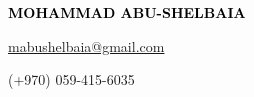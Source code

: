 \documentclass[9pt]{developercv} %
\begin{document}

\begin{minipage}[t]{0.5\textwidth} 
	\vspace{-\baselineskip} %
	
	{ \fontsize{16}{20} \textcolor{black}{\textbf{\MakeUppercase{Mohammad Abu-Shelbaia}}}} %
	
	\vspace{6pt}
	
	{\Large \href{mailto:mabushelbaia@gmail.com}{mabushelbaia@gmail.com}} 
 
	\vspace{6pt}
	
{\Large (+970) 059-415-6035} 
\end{minipage}
\hfill
\begin{minipage}[t]{0.2\textwidth} %
	\vspace{-\baselineskip} %
	
	
\end{minipage}
\begin{minipage}[t]{0.27\textwidth} %
	\vspace{-\baselineskip} %
	
	\\ 
    \\
    \\
    
\end{minipage}


\end{document}
